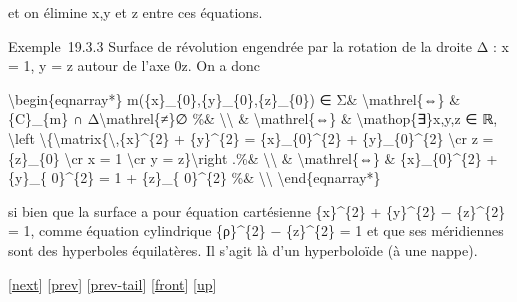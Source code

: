 \documentclass[]{article}
\begin{document}
et on élimine x,y et z entre ces équations.

Exemple~19.3.3 Surface de révolution engendrée par la rotation de la
droite Δ : x = 1, y = z autour de l'axe 0z. On a donc

\textbackslash{}begin\{eqnarray*\}
m(\{x\}\_\{0\},\{y\}\_\{0\},\{z\}\_\{0\}) ∈ Σ\&
\textbackslash{}mathrel\{⇔\} \& \{C\}\_\{m\} ∩
Δ\textbackslash{}mathrel\{≠\}∅ \%\& \textbackslash{}\textbackslash{} \&
\textbackslash{}mathrel\{⇔\} \& \textbackslash{}mathop\{∃\}x,y,z ∈ ℝ,
\textbackslash{}left
\textbackslash{}\{\textbackslash{}matrix\{\textbackslash{},\{x\}\^{}\{2\}
+ \{y\}\^{}\{2\} = \{x\}\_\{0\}\^{}\{2\} + \{y\}\_\{0\}\^{}\{2\}
\textbackslash{}cr z = \{z\}\_\{0\} \textbackslash{}cr x = 1
\textbackslash{}cr y = z\}\textbackslash{}right .\%\&
\textbackslash{}\textbackslash{} \& \textbackslash{}mathrel\{⇔\} \&
\{x\}\_\{0\}\^{}\{2\} + \{y\}\_\{ 0\}\^{}\{2\} = 1 + \{z\}\_\{
0\}\^{}\{2\} \%\& \textbackslash{}\textbackslash{}
\textbackslash{}end\{eqnarray*\}

si bien que la surface a pour équation cartésienne \{x\}\^{}\{2\} +
\{y\}\^{}\{2\} − \{z\}\^{}\{2\} = 1, comme équation cylindrique
\{ρ\}\^{}\{2\} − \{z\}\^{}\{2\} = 1 et que ses méridiennes sont des
hyperboles équilatères. Il s'agit là d'un hyperboloïde (à une nappe).

{[}\href{coursse103.html}{next}{]} {[}\href{coursse101.html}{prev}{]}
{[}\href{coursse101.html\#tailcoursse101.html}{prev-tail}{]}
{[}\href{coursse102.html}{front}{]}
{[}\href{coursch20.html\#coursse102.html}{up}{]}
\end{document}
